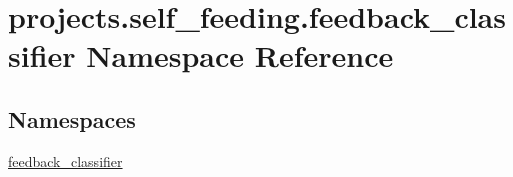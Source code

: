 \hypertarget{namespaceprojects_1_1self__feeding_1_1feedback__classifier}{}\section{projects.\+self\+\_\+feeding.\+feedback\+\_\+classifier Namespace Reference}
\label{namespaceprojects_1_1self__feeding_1_1feedback__classifier}
\subsection*{Namespaces}
\begin{DoxyCompactItemize}
\item 
 \hyperlink{namespaceprojects_1_1self__feeding_1_1feedback__classifier_1_1feedback__classifier}{feedback\+\_\+classifier}
\end{DoxyCompactItemize}
